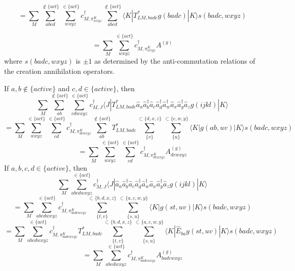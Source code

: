 \documentclass[12pt]{article}
\begin{document}
\begin{equation*}
= \sum_{M}  \sum_{abcd}^{\notin \{act\} } \sum_{wxyz}^{\in\{act\}} 
c^{\dagger}_{M,\pi^{K}_{wxyz}}
 \sum_{abcd}^{\notin \{act\} }  \langle K |T^{*}_{LM,badc}g(badc) |K  \rangle s(badc, wxyz)
\end{equation*}
 
\begin{equation*}
= \sum_{M}  \sum_{wxyz}^{\in\{act\}} c^{\dagger}_{M,\pi^{K}_{wxyz}}  A^{(g)}
\end{equation*}
where $s(badc,wxyz)$ is $\pm 1$ as determined by the anti-commutation relations of the creation annihilation operators.

\noindent If $a,b \notin \{active\} $ and $c,d \in \{active\}$, then
\begin{equation*}
 \sum_{M}  \sum_{ab}^{\notin \{act\} } \sum_{cdwxyz}^{\in\{act\}} 
 c^{\dagger}_{M,J}  \langle J|T^{*}_{LM,badc}\hat{a}_{a}\hat{a}^{\dagger}_{b}
\hat{a}_{c}\hat{a}^{\dagger}_{d}\hat{a}^{\dagger}_{w}\hat{a}_{x}\hat{a}^{\dagger}_{y}\hat{a}_{z}g(ijkl) |K  \rangle
\end{equation*}
\begin{equation*}
= \sum_{M}  \sum_{wxyz}^{\in\{act\}} 
\sum_{cd}^{\in\{act\}}  c^{\dagger}_{M,\pi^{K}_{dcwxyz}}
\sum_{ab}^{\notin \{act\} }
T^{*}_{LM,badc}
\sum_{\{v\}}^{\subset\{d,x,z\}}\sum_{\{u\}}^{\subset\{c,w,y\}}
\langle K| g(ab,uv) |K  \rangle s(badc,wxyz)
\end{equation*}
\begin{equation*}
= \sum_{M}  \sum_{wxyz}^{\in\{act\}} 
\sum_{cd}^{\in\{act\}}  c^{\dagger}_{M,\pi^{K}_{dcwxyz}}A^{(g)}_{dcwxyz}
\end{equation*}
\noindent If $a,b,c,d \in \{active\}$, then
\begin{equation*}
 \sum_{M}  \sum_{abcdwxyz}^{\in\{act\}} 
 c^{\dagger}_{M,J}  \langle J|\hat{a}_{a}\hat{a}^{\dagger}_{b}
\hat{a}_{c}\hat{a}^{\dagger}_{d}\hat{a}^{\dagger}_{w}\hat{a}_{x}\hat{a}^{\dagger}_{y}\hat{a}_{z}g(ijkl) |K  \rangle
\end{equation*}
\begin{equation*}
= \sum_{M}   \sum_{abcdwxyz}^{\in\{act\}} 
 c^{\dagger}_{M,\pi^{K}_{badcwxyz}} 
 \sum_{\{t,v\}}^{\subset\{b,d,x,z\}}\sum_{\{s,u\}}^{\subset\{a,c,w,y\}}
 \langle K|g(st,uv) |K  \rangle  s(badc,wxyz)
\end{equation*}
\begin{equation*}
= \sum_{M}   \sum_{abcdwxyz}^{\in\{act\}} 
 c^{\dagger}_{M,\pi^{K}_{badcwxyz}} T^{*}_{LM,badc}
 \sum_{\{t,v\}}^{\subset\{b,d,x,z\}}\sum_{\{s,u\}}^{\subset\{a,c,w,y\}}
 \langle K|\hat{E}_{ba}g(st,uv) |K  \rangle  s(badc,wxyz)
\end{equation*}
\begin{equation*}
= \sum_{M}   \sum_{abcdwxyz}^{\in\{act\}} 
 c^{\dagger}_{M,\pi^{K}_{badcwxyz}} A_{badcwxyz}^{(g)}\end{equation*}
\end{document}

